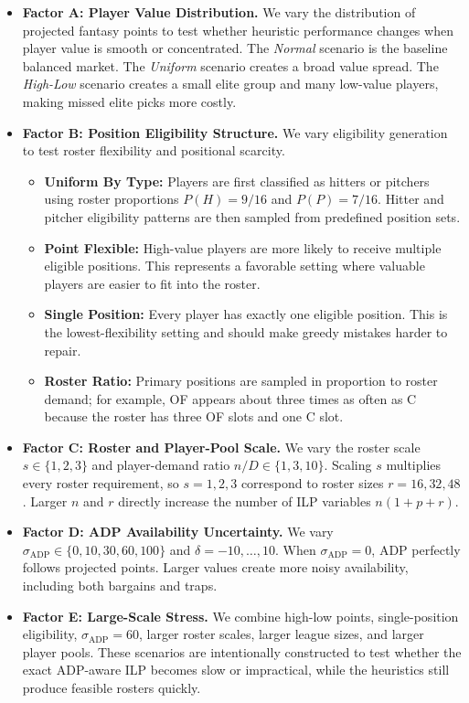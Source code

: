 \documentclass[12pt]{article}
\begin{document}
\begin{itemize}[itemsep=2pt, parsep=0pt, topsep=4pt]
    \item \textbf{Factor A: Player Value Distribution.} We vary the distribution of projected fantasy points to test whether heuristic performance changes when player value is smooth or concentrated. The \textit{Normal} scenario is the baseline balanced market. The \textit{Uniform} scenario creates a broad value spread. The \textit{High-Low} scenario creates a small elite group and many low-value players, making missed elite picks more costly.

    \item \textbf{Factor B: Position Eligibility Structure.} We vary eligibility generation to test roster flexibility and positional scarcity.
    \begin{itemize}[itemsep=2pt, parsep=0pt, topsep=2pt]
        \item \textbf{Uniform By Type:} Players are first classified as hitters or pitchers using roster proportions \(P(H)=9/16\) and \(P(P)=7/16\). Hitter and pitcher eligibility patterns are then sampled from predefined position sets.
        \item \textbf{Point Flexible:} High-value players are more likely to receive multiple eligible positions. This represents a favorable setting where valuable players are easier to fit into the roster.
        \item \textbf{Single Position:} Every player has exactly one eligible position. This is the lowest-flexibility setting and should make greedy mistakes harder to repair.
        \item \textbf{Roster Ratio:} Primary positions are sampled in proportion to roster demand; for example, OF appears about three times as often as C because the roster has three OF slots and one C slot.
    \end{itemize}

    \item \textbf{Factor C: Roster and Player-Pool Scale.} We vary the roster scale \(s\in\{1,2,3\}\) and player-demand ratio \(n/D\in\{1,3,10\}\). Scaling \(s\) multiplies every roster requirement, so \(s=1,2,3\) correspond to roster sizes \(r=16,32,48\). Larger \(n\) and \(r\) directly increase the number of ILP variables \(n(1+p+r)\).

    \item \textbf{Factor D: ADP Availability Uncertainty.} We vary \(\sigma_{\text{ADP}}\in\{0,10,30,60,100\}\) and \(\delta=-10,\ldots,10\). When \(\sigma_{\text{ADP}}=0\), ADP perfectly follows projected points. Larger values create more noisy availability, including both bargains and traps.

    \item \textbf{Factor E: Large-Scale Stress.} We combine high-low points, single-position eligibility, \(\sigma_{\text{ADP}}=60\), larger roster scales, larger league sizes, and larger player pools. These scenarios are intentionally constructed to test whether the exact ADP-aware ILP becomes slow or impractical, while the heuristics still produce feasible rosters quickly.
\end{itemize}
\end{document}
